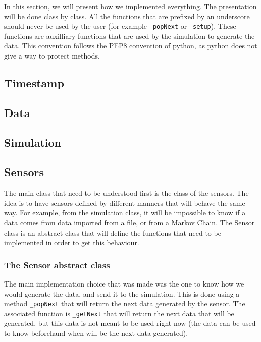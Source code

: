 
In this section, we will present how we implemented everything. The presentation will be done class by class. All the functions that are prefixed by an underscore should never be used by the user (for example \verb!_popNext! or \verb!_setup!). These functions are auxilliary functions that are used by the simulation to generate the data. This convention follows the PEP8 convention of python, as python does not give a way to protect methods.

\subsection{Timestamp}



\subsection{Data}



\subsection{Simulation}


\subsection{Sensors}

The main class that need to be understood first is the class of the
sensors. The idea is to have sensors defined by different manners that will
behave the same way. For example, from the simulation class, it will be
impossible to know if a data comes from data imported from a file, or from
a Markov Chain. The Sensor class is an abstract class that will define the
functions that need to be implemented in order to get this behaviour.

\subsubsection{The Sensor abstract class}

The main implementation choice that was made was the one to know how we would
generate the data, and send it to the simulation. This is done using a method
\verb!_popNext! that will return the next data generated by the sensor. The
associated function is \verb!_getNext! that will return the next data that will
be generated, but this data is not meant to be used right now (the data can be
used to know beforehand when will be the next data generated).

